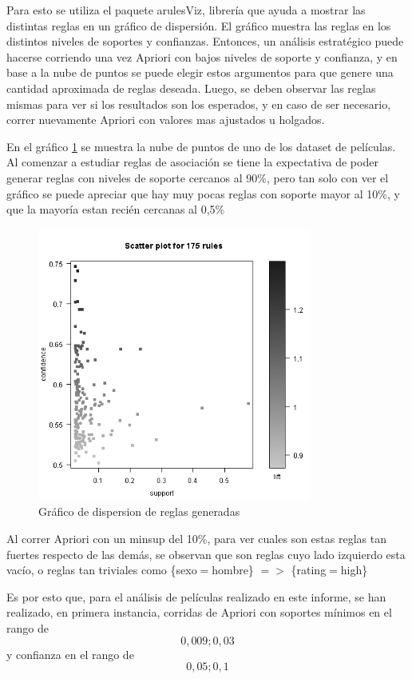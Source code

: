 \documentclass[journal]{IEEEtran}
\begin{document}
Para esto se utiliza el paquete arulesViz, librería que ayuda a mostrar las 
distintas reglas en un gráfico de dispersión. El gráfico muestra las reglas
en los distintos niveles de soportes y confianzas. Entonces, un análisis estratégico
puede hacerse corriendo una vez Apriori con bajos niveles de soporte y confianza, y 
en base a la nube de puntos se puede elegir estos argumentos para que genere 
una  cantidad aproximada de reglas deseada. Luego, se deben observar las reglas mismas para ver
si los resultados son los esperados, y en caso de ser necesario, correr nuevamente
Apriori con valores mas ajustados u holgados.

En el gráfico \ref{arulesviz} se muestra la nube de puntos de uno de los dataset de películas.
Al comenzar a estudiar reglas de asociación se tiene la expectativa de poder generar
reglas con niveles de soporte cercanos al 90\%, pero tan solo con ver el gráfico
se puede apreciar que hay muy pocas reglas con soporte mayor al 10\%, y que la mayoría
estan recién cercanas al 0,5\%

\begin{figure}[ht!]
\centering
\includegraphics[width=90mm]{arulesviz.png}
\caption{Gráfico de dispersion de reglas generadas}
\label{arulesviz}
\end{figure}

Al correr Apriori con un minsup del 10\%, para ver cuales son estas reglas tan
fuertes respecto de las demás, se observan que son reglas cuyo lado izquierdo
esta vacío, o reglas tan triviales como \{sexo$=$hombre\} $=$$>$ \{rating$=$high\}

Es por esto que, para el análisis de películas realizado en este informe, se han
realizado, en primera instancia, 
 corridas de Apriori con soportes mínimos en el rango de \[0,009 ; 0,03\]
y confianza en el rango de \[0,05 ; 0,1\]
\end{document}
